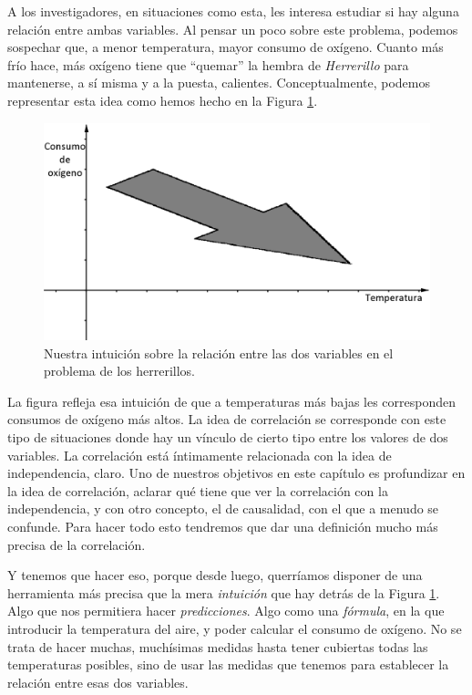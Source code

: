A los investigadores, en situaciones como esta, les interesa estudiar si hay alguna relación entre ambas variables. Al pensar un poco sobre este problema, podemos sospechar que, a menor temperatura, mayor consumo de oxígeno. Cuanto más frío hace, más oxígeno tiene que ``quemar'' la hembra de {\em Herrerillo} para mantenerse, a sí misma y a la puesta, calientes. Conceptualmente, podemos representar esta idea como hemos hecho en la Figura \ref{cap10:fig:Herrerillo02}.

\begin{figure}[htbp]
\begin{center}
\includegraphics[width=13cm]{../fig/Cap10-IntuicionProblemaHerrerillos.png}
\caption{Nuestra intuición sobre la relación entre las dos variables en el problema de los herrerillos.}
\label{cap10:fig:Herrerillo02}
\end{center}
\end{figure}

La figura refleja esa intuición de que a temperaturas más bajas les corresponden consumos de oxígeno más altos. La idea de {\sf correlación} se corresponde con este tipo de situaciones donde hay un vínculo de cierto tipo entre los valores de dos variables. La correlación está íntimamente relacionada con la idea de independencia, claro. Uno de nuestros objetivos en este capítulo es profundizar en la idea de correlación, aclarar qué tiene que ver la correlación con la independencia, y con otro concepto, el de {\sf causalidad},  con el que a menudo se confunde. Para hacer todo esto tendremos que dar una definición mucho más precisa de la correlación.

Y tenemos que hacer eso, porque desde luego, querríamos disponer de una herramienta más precisa que la mera {\em intuición} que hay detrás de la Figura \ref{cap10:fig:Herrerillo02}. Algo que nos permitiera hacer {\em predicciones}. Algo como una {\em fórmula}, en la que introducir la temperatura del aire, y poder calcular el consumo de oxígeno. No se trata de hacer muchas, muchísimas medidas hasta tener cubiertas todas las temperaturas posibles, sino de usar las medidas que tenemos para establecer la relación entre esas dos variables.

